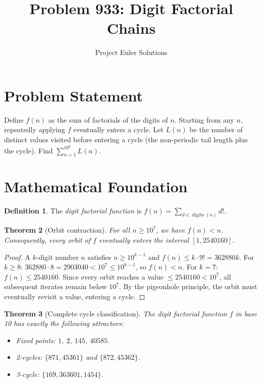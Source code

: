 \documentclass[11pt]{article}
\title{Problem 933: Digit Factorial Chains}
\author{Project Euler Solutions}
\date{}
\newtheorem{theorem}{Theorem}
\theoremstyle{definition}
\newtheorem{definition}[theorem]{Definition}
\begin{document}
\maketitle

\section{Problem Statement}

Define $f(n)$ as the sum of factorials of the digits of $n$. Starting from any $n$, repeatedly applying $f$ eventually enters a cycle. Let $L(n)$ be the number of distinct values visited before entering a cycle (the non-periodic tail length plus the cycle). Find $\sum_{n=1}^{10^6} L(n)$.

\section{Mathematical Foundation}

\begin{definition}
The \emph{digit factorial function} is $f(n) = \sum_{d \in \operatorname{digits}(n)} d!$.
\end{definition}

\begin{theorem}[Orbit contraction]
For all $n \geq 10^7$, we have $f(n) < n$. Consequently, every orbit of $f$ eventually enters the interval $[1, 2540160]$.
\end{theorem}

\begin{proof}
A $k$-digit number $n$ satisfies $n \geq 10^{k-1}$ and $f(n) \leq k \cdot 9! = 362880k$. For $k \geq 8$: $362880 \cdot 8 = 2903040 < 10^7 \leq 10^{k-1}$, so $f(n) < n$. For $k = 7$: $f(n) \leq 2540160$. Since every orbit reaches a value $\leq 2540160 < 10^7$, all subsequent iterates remain below $10^7$. By the pigeonhole principle, the orbit must eventually revisit a value, entering a cycle.
\end{proof}

\begin{theorem}[Complete cycle classification]
The digit factorial function $f$ in base 10 has exactly the following attractors:
\begin{itemize}
\item Fixed points: $1$, $2$, $145$, $40585$.
\item 2-cycles: $\{871, 45361\}$ and $\{872, 45362\}$.
\item 3-cycle: $\{169, 363601, 1454\}$.
\end{itemize}
\end{theorem}
\end{document}
